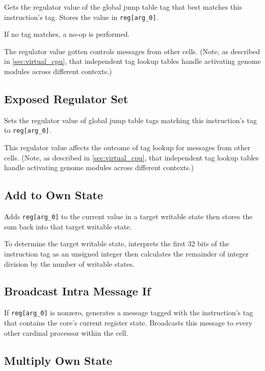 Gets the regulator value of the global jump table tag that best matches this instruction's tag.
Stores the value in \texttt{reg[arg\_0]}.

If no tag matches, a no-op is performed.

The regulator value gotten controls messages from other cells.
(Note, as described in \ref{sec:virtual_cpu}, that independent tag lookup tables handle activating genome modules across different contexts.)

\subsection{Exposed Regulator Set}


Sets the regulator value of global jump table tags matching this instruction's tag to \texttt{reg[arg\_0]}.

This regulator value affects the outcome of tag lookup for messages from other cells.
(Note, as described in \ref{sec:virtual_cpu}, that independent tag lookup tables handle activating genome modules across different contexts.)

\subsection{Add to Own State}


Adds \texttt{reg[arg\_0]} to the current value in a target writable state then stores the sum back into that target writable state.

To determine the target writable state, interprets the first 32 bits of the instruction tag as an unsigned integer then calculates the remainder of integer division by the number of writable states.

\subsection{Broadcast Intra Message If}


If \texttt{reg[arg\_0]} is nonzero, generates a message tagged with the instruction's tag that contains the core's current register state.
Broadcasts this message to every other cardinal processor within the cell.

\subsection{Multiply Own State}

